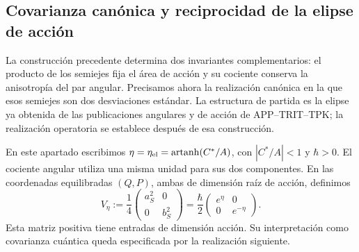 
\subsection{Covarianza canónica y reciprocidad de la elipse de acción}
\label{sec:ii-area-covarianza}

La construcción precedente determina dos invariantes complementarios:
el producto de los semiejes fija el área de acción y su cociente conserva
la anisotropía del par angular. Precisamos ahora la realización canónica
en la que esos semiejes son dos desviaciones estándar. La estructura de
partida es la elipse ya obtenida de las publicaciones angulares y de
acción de APP--TRIT--TPK; la realización operatoria se establece después
de esa construcción.

En este apartado escribimos \(\eta=\eta_{\rm el}
=\operatorname{artanh}(C^*/A)\), con \(|C^*/A|<1\) y
\(\hbar>0\). El cociente angular utiliza una misma unidad para sus dos
componentes. En las coordenadas equilibradas \((Q,P)\), ambas de
dimensión raíz de acción, definimos
\begin{equation}
 V_\eta:=\frac14
 \begin{pmatrix}a_S^2&0\\0&b_S^2\end{pmatrix}
 =\frac{\hbar}{2}
 \begin{pmatrix}e^\eta&0\\0&e^{-\eta}\end{pmatrix}.
 \label{eq:ii-covarianza-geometrica}
\end{equation}
Esta matriz positiva tiene entradas de dimensión acción. Su interpretación
como covarianza cuántica queda especificada por la realización siguiente.

